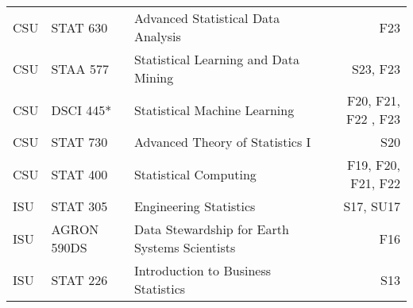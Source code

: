 \documentclass[margin,line]{res}
\begin{document}
\begin{resume}
\begin{table}[H]
\begin{tabular}{l l l r}
CSU & STAT 630 & Advanced Statistical Data Analysis & F23 \\
CSU & STAA 577 & Statistical Learning and Data Mining  & S23, F23 \\
CSU & DSCI 445* & Statistical Machine Learning & F20, F21, F22 , F23 \\
CSU & STAT 730 & Advanced Theory of Statistics I & S20 \\
CSU & STAT 400 & Statistical Computing & F19, F20, F21, F22 \\
ISU & STAT 305 & Engineering Statistics & S17, SU17 \\
ISU & AGRON 590DS & Data Stewardship for Earth Systems Scientists & F16 \\
ISU & STAT 226 & Introduction to Business Statistics & S13 \\
\end{tabular}
\end{table}

% 
% 
% 
% 

% 
% 


\end{resume}
\end{document}
